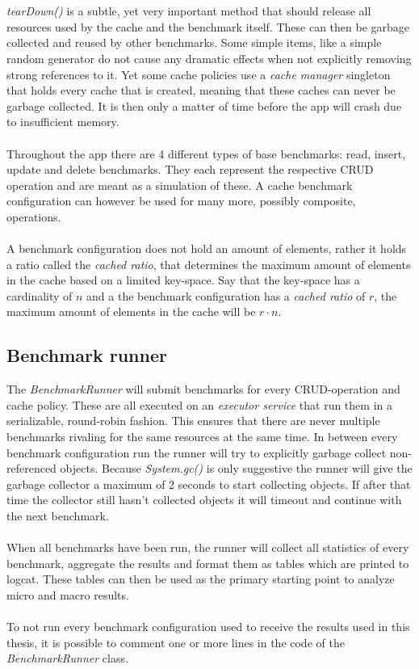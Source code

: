 \documentclass[pdftex,a4paper,12pt,twoside]{report}
\begin{document}
\\\\
\emph{tearDown()} is a subtle, yet very important method that should release all resources used by the cache and the benchmark itself. These can then be garbage collected and reused by other benchmarks. Some simple items, like a simple random generator do not cause any dramatic effects when not explicitly removing strong references to it. Yet some cache policies use a \emph{cache manager} singleton that holds every cache that is created, meaning that these caches can never be garbage collected. It is then only a matter of time before the app will crash due to insufficient memory.
\\\\
Throughout the app there are 4 different types of base benchmarks: read, insert, update and delete benchmarks. They each represent the respective CRUD operation and are meant as a simulation of these. A cache benchmark configuration can however be used for many more, possibly composite, operations.
\\\\
A benchmark configuration does not hold an amount of elements, rather it holds a ratio called the \emph{cached ratio}, that determines the maximum amount of elements in the cache based on a limited key-space. Say that the key-space has a cardinality of $n$ and a the benchmark configuration has a \emph{cached ratio} of $r$, the maximum amount of elements in the cache will be $r \cdot n$.
\subsection{Benchmark runner}
The \emph{BenchmarkRunner} will submit benchmarks for every CRUD-operation and cache policy. These are all executed on an \emph{executor service} that run them in a serializable, round-robin fashion. This ensures that there are never multiple benchmarks rivaling for the same resources at the same time. In between every benchmark configuration run the runner will try to explicitly garbage collect non-referenced objects. Because \emph{System.gc()} is only suggestive \citep{system_gc} the runner will give the garbage collector a maximum of 2 seconds to start collecting objects. If after that time the collector still hasn't collected objects it will timeout and continue with the next benchmark.
\\\\
When all benchmarks have been run, the runner will collect all statistics of every benchmark, aggregate the results and format them as tables which are printed to logcat. These tables can then be used as the primary starting point to analyze micro and macro results.
\\\\
To not run every benchmark configuration used to receive the results used in this thesis, it is possible to comment one or more lines in the code of the \emph{BenchmarkRunner} class.
\end{document}
